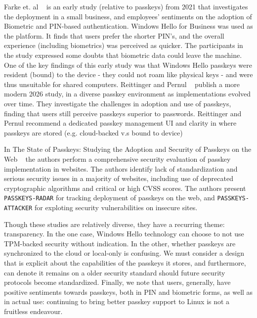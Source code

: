 \documentclass[letterpaper,twocolumn,10pt]{article}
\begin{document}
Farke et. al ~\cite{281252} is an early study (relative to passkeys) from 2021 that investigates the deployment in a small business, and employees' sentiments on the adoption of Biometric and PIN-based authentication. Windows Hello for Business was used as the platform. It finds that users prefer the shorter PIN's, and the overall experience (including biometrics) was perceived as quicker. The participants in the study expressed some doubts that biometric data could leave the machine. One of the key findings of this early study was that Windows Hello passkeys were resident (bound) to the device - they could not roam like physical keys - and were thus unsuitable for shared computers. Reittinger and Pernul ~\cite{11573563} publish a more modern 2026 study, in a diverse passkey environment as implementations evolved over time. They investigate the challenges in adoption and use of passkeys, finding that users still perceive
passkeys superior to passwords. Reittinger and Pernul recommend a dedicated passkey management UI and clarity in where passkeys are stored (e.g. cloud-backed v.s bound to device)

In The State of Passkeys: Studying the Adoption and Security of Passkeys on the Web ~\cite{jannett2026stateofpasskeys} the authors perform a comprehensive
security evaluation of passkey implementation in websites.
The authors identify lack of standardization and serious
security issues in a majority of websites, including use
of deprecated cryptographic algorithms and critical or
high CVSS scores. The authors present
\texttt{PASSKEYS-RADAR} for tracking deployment of
passkeys on the web, and \texttt{PASSKEYS-ATTACKER} for
exploting security vulnerabilities on insecure sites.

Though these studies are relatively diverse, they have a recurring theme: transparency. In the one case, Windows Hello technology
can choose to not use TPM-backed security without indication. In the other, whether passkeys are synchronized to the cloud or local-only
is confusing. We must consider a design that is explicit about the capabilities of the passkeys it stores, and furthermore, can denote it
remains on a older security standard should future security protocols become standardized. Finally, we note that users, generally, have positive sentiments towards passkeys, both in PIN and biometric forms, as well as in actual use: continuing to bring better passkey support
to Linux is not a fruitless endeavour.
\end{document}
